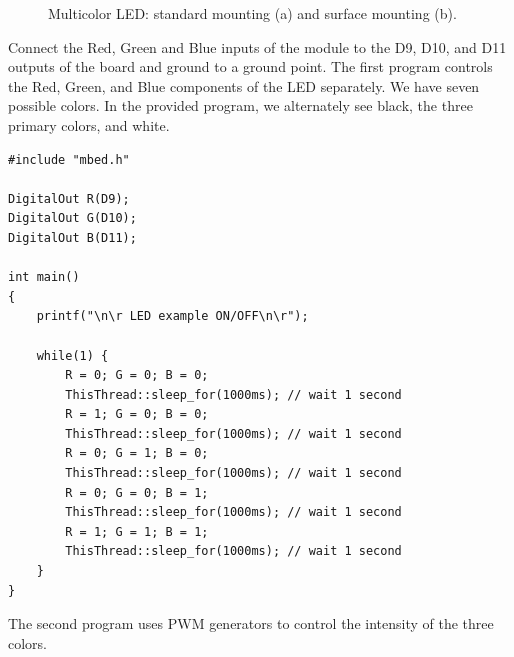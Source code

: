 \documentclass[10pt,a4paper,onecolumn]{article}
\begin{document}
\begin{figure}[H]
  \begin{center}
    \caption{Multicolor LED: standard mounting (a) and surface mounting (b).}
  \end{center}
\end{figure}

Connect the Red, Green and Blue inputs of the module to the D9, D10, and D11 outputs of the board and ground to a ground point. The first program controls the Red, Green, and Blue components of the LED separately. We have seven possible colors. In the provided program, we alternately see black, the three primary colors, and white.

\begin{lstlisting}[style=CStyle]
#include "mbed.h"

DigitalOut R(D9);
DigitalOut G(D10);
DigitalOut B(D11);

int main()
{
    printf("\n\r LED example ON/OFF\n\r");

    while(1) {
        R = 0; G = 0; B = 0;
        ThisThread::sleep_for(1000ms); // wait 1 second
        R = 1; G = 0; B = 0;
        ThisThread::sleep_for(1000ms); // wait 1 second
        R = 0; G = 1; B = 0;
        ThisThread::sleep_for(1000ms); // wait 1 second
        R = 0; G = 0; B = 1;
        ThisThread::sleep_for(1000ms); // wait 1 second
        R = 1; G = 1; B = 1;
        ThisThread::sleep_for(1000ms); // wait 1 second
    }
}
\end{lstlisting}

The second program uses PWM generators to control the intensity of the three colors.
\end{document}

